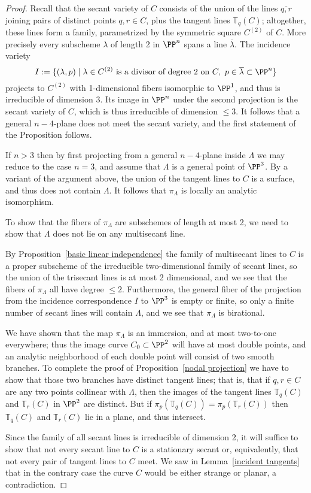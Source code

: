 \begin{proof} Recall that the secant variety of $C$ consists of the union of the lines $\overline{q,r}$ joining pairs of distinct points $q,r \in C$, plus the tangent lines ${\mathbb T}_q(C)$; altogether, these lines form a family, parametrized by the symmetric square $C^{(2)}$ of $C$. More precisely every subscheme $\lambda$ of
length 2 in $\PP^n$ spans a line $\overline \lambda$. The incidence variety
$$
I:=\{(\lambda, p)\mid \lambda\in C^{(2)} \hbox{ is a divisor of degree 2 on }C,\ p\in \overline \lambda\subset\PP^n\}
$$
projects to $C^{(2)}$ with 1-dimensional fibers isomorphic to $\PP^1$, and thus
is irreducible of dimension 3. Its image in $\PP^n$ under the second projection
is the secant variety of $C$, which is thus irreducible of dimension $\leq 3$.
It follows that a general
$n-4$-plane does not meet the secant variety, and the first statement of the Proposition follows.

If $n>3$ then by first projecting from a general $n-4$-plane inside $\Lambda$ we may reduce to the case $n=3$, and assume that $\Lambda$ is a general point of $\PP^3$. By a variant of the argument above, the union 
of the tangent lines to $C$ is a surface, and thus does not contain $\Lambda$.
It follows that $\pi_\Lambda$ is locally an analytic isomorphism.

To show that the fibers of $\pi_\Lambda$ are subschemes of length at most 2,
we need to show that $\Lambda$ does not lie on any multisecant line. 

By Proposition~\ref{basic linear independence} the family of multisecant lines to $C$ is a proper subscheme of the irreducible two-dimensional family of secant lines, so the union of the trisecant lines is at most 2 dimensional, and we see that the fibers of $\pi_\Lambda$ all have degree $\leq 2$. Furthermore, the general fiber of the projection
from the incidence correspondence $I$ to $\PP^3$ is empty or finite, so only a finite number of secant lines will contain $\Lambda$, and we see that $\pi_\Lambda$ is birational. 

We have shown that the map $\pi_\Lambda$ is an immersion, and at most two-to-one everywhere; thus the image curve $C_0 \subset \PP^2$ will have at most double points, and an analytic neighborhood of each double point will consist of two smooth branches. To complete the proof of Proposition~\ref{nodal projection} we have to show that those two branches have distinct tangent lines; that is, that
if $q, r \in C$ are any two points collinear with $\Lambda$, then the images of the tangent lines ${\mathbb T}_q(C)$ and ${\mathbb T}_r(C)$ in $\PP^2$ are distinct. But if  $\pi_p({\mathbb T}_q(C)) = \pi_p({\mathbb T}_r(C))$ then  ${\mathbb T}_q(C)$ and ${\mathbb T}_r(C)$ lie in a plane, and thus intersect.

Since the family of all secant lines is irreducible of dimension 2,  it will suffice to show that not every secant line to $C$ is a stationary secant or, equivalently, that not every pair of tangent lines to $C$ meet. We saw in Lemma~\ref{incident tangents} that in the contrary case the curve $C$ would be either strange or planar, a contradiction.
\end{proof}


